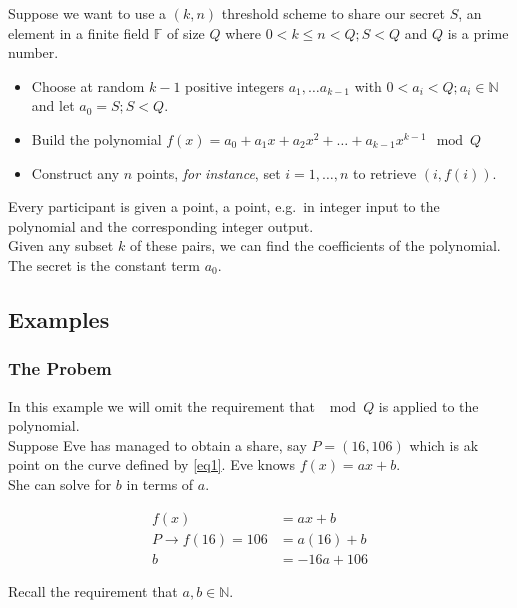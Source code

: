\documentclass[preview,border=3mm]{article}
\begin{document}
\noindent
Suppose we want to use a $(k,n)$ threshold scheme to share our secret $S$, an
element in a finite field $\mathbb{F}$ of size $Q$ where
$0 < k \leq n < Q; S < Q$ and $Q$ is a prime number.

\begin{itemize}
    \item Choose at random $k-1$ positive integers $a_1, \ldots a_{k-1}$
        with $0 < a_i < Q; a_i \in \mathbb{N}$ and let $a_0 = S; S < Q$.
    \item Build the polynomial
        $f(x) = a_0 + a_1x + a_2x^2 + \ldots + a_{k-1}x^{k-1} \mod Q$
    \item Construct any $n$ points, \emph{for instance}, set $i = 1, \ldots , n$
        to retrieve $(i, f(i))$.
\end{itemize}

\noindent
Every participant is given a point, a point, e.g.\ in integer input to the
polynomial and the corresponding integer output. \\

\noindent
Given any subset $k$ of these pairs, we can find the coefficients of the
polynomial. The secret is the constant term $a_0$.


\subsection{Examples}

\subsubsection{The Probem}
In this example we will omit the requirement that $\mod Q$ is applied to
the polynomial. \\

\noindent
Suppose Eve has managed to obtain a share, say $P = (16, 106)$ which is ak
point on the curve defined by \ref{eq1}. Eve knows $f(x) = ax + b$. \\

\noindent
She can solve for $b$ in terms of $a$.

\begin{align}
    f(x) &= ax + b \nonumber \\
    P \rightarrow f(16) = 106 &= a(16) + b \nonumber \\
    b &= -16a + 106 \label{eq20}
\end{align}

\noindent
Recall the requirement that $a,b \in \mathbb{N}$.\\
\end{document}

